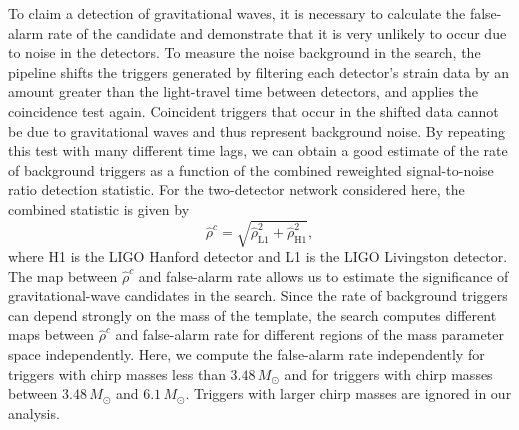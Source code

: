\documentclass[12pt]{iopart} \usepackage{graphicx,amssymb}
\begin{document}
To claim a detection of gravitational waves, it is necessary to calculate the
false-alarm rate of the candidate and demonstrate that it is very unlikely to
occur due to noise in the detectors. To measure the noise background in the
search, the pipeline shifts the triggers generated by filtering each
detector's strain data by an amount greater than the light-travel time between
detectors, and applies the coincidence test again.  Coincident triggers that
occur in the shifted data cannot be due to gravitational waves and thus represent
background noise. By repeating this test with many different time lags, we can
obtain a good estimate of the rate of background triggers as a function of the
combined reweighted signal-to-noise ratio detection statistic. For the 
two-detector network considered here, the combined statistic is given by
%
\begin{equation}
\hat{\rho}^c = \sqrt{\hat{\rho}_\mathrm{L1}^2 + \hat{\rho}_\mathrm{H1}^2},
\end{equation}
%
where H1 is the LIGO Hanford detector and L1 is the LIGO Livingston detector. 
The map between $\hat{\rho}^c$ and false-alarm rate allows us to estimate the
significance of gravitational-wave candidates in the search. Since the rate of
background triggers can depend strongly on the mass of the template,
the search computes different maps between $\hat{\rho}^c$ and
false-alarm rate for different regions of the mass parameter space
independently. Here, we compute the false-alarm rate independently for
triggers with chirp masses less than $3.48\, M_\odot$ and for triggers with
chirp masses between $3.48\, M_\odot$ and $6.1\, M_\odot$. Triggers with
larger chirp masses are ignored in our analysis.
\end{document}

